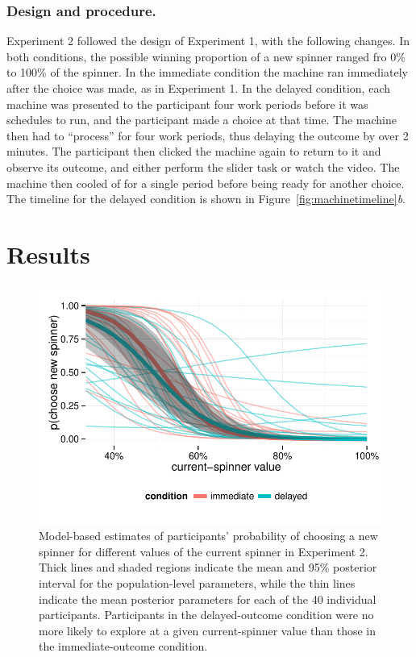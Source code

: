 \documentclass[10pt,letterpaper]{article}
\begin{document}
\subsubsection{Design and procedure.}

Experiment 2 followed the design of Experiment 1, with the following changes. In
both conditions, the possible winning proportion of a new spinner ranged fro 0\% to 100\% of
the spinner. In the immediate condition the machine ran immediately after the
choice was made, as in Experiment 1. In the delayed condition, each machine was
presented to the participant four work periods before it was schedules to run,
and the participant made a choice at that time. The machine then had to
``process'' for four work periods, thus delaying
the outcome by over 2 minutes. The participant then clicked the machine again to
return to it and observe its outcome, and either perform the slider task or
watch the video. The machine then cooled of for a single period before being
ready for another choice. The timeline for the delayed condition is shown in
Figure~\ref{fig:machinetimeline}\emph{b}.

\section{Results}

\begin{figure}
\centering
\includegraphics[width=\columnwidth]{figures/exp2results.pdf}
\caption{Model-based estimates of participants' probability of choosing a new
  spinner for different values of the current spinner in Experiment 2. Thick
  lines and shaded regions indicate the mean and 95\% posterior interval for the
  population-level parameters, while the thin lines indicate the mean posterior
  parameters for each of the 40 individual participants. Participants in the
  delayed-outcome condition were no more
  likely to explore at a given current-spinner value than those in the
  immediate-outcome condition.}
\label{fig:exp2results}
\end{figure}
\end{document}
